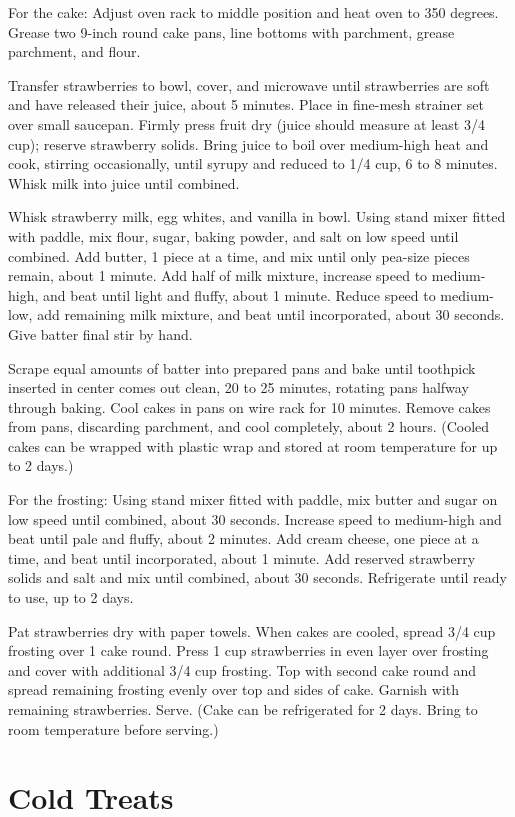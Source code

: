 \documentclass[12pt,landscape,twoside,twocolumn, openright, titlepage, draft]{book}
\begin{document}
For the cake: Adjust oven rack to middle position and heat oven to 350 degrees. Grease two 9-inch round cake pans, line bottoms with parchment, grease parchment, and flour.

Transfer strawberries to bowl, cover, and microwave until strawberries are soft and have released their juice, about 5 minutes. Place in fine-mesh strainer set over small saucepan. Firmly press fruit dry (juice should measure at least 3/4 cup); reserve strawberry solids. Bring juice to boil over medium-high heat and cook, stirring occasionally, until syrupy and reduced to 1/4 cup, 6 to 8 minutes. Whisk milk into juice until combined.

Whisk strawberry milk, egg whites, and vanilla in bowl. Using stand
mixer fitted with paddle, mix flour, sugar, baking powder, and salt on
low speed until combined. Add butter, 1 piece at a time, and mix until
only pea-size pieces remain, about 1 minute. Add half of milk mixture,
increase speed to medium-high, and beat until light and fluffy, about
1 minute. Reduce speed to medium-low, add remaining milk mixture, and
beat until incorporated, about 30 seconds. Give batter final stir by
hand.

Scrape equal amounts of batter into prepared pans and bake until
toothpick inserted in center comes out clean, 20 to 25 minutes,
rotating pans halfway through baking. Cool cakes in pans on wire rack
for 10 minutes. Remove cakes from pans, discarding parchment, and cool
completely, about 2 hours. (Cooled cakes can be wrapped with plastic
wrap and stored at room temperature for up to 2 days.)

For the frosting: Using stand mixer fitted with paddle, mix butter and
sugar on low speed until combined, about 30 seconds. Increase speed to
medium-high and beat until pale and fluffy, about 2 minutes. Add cream
cheese, one piece at a time, and beat until incorporated, about 1
minute. Add reserved strawberry solids and salt and mix until
combined, about 30 seconds. Refrigerate until ready to use, up to 2
days.

Pat strawberries dry with paper towels. When cakes are cooled, spread
3/4 cup frosting over 1 cake round. Press 1 cup strawberries in even
layer over frosting and cover with additional 3/4 cup frosting. Top
with second cake round and spread remaining frosting evenly over top
and sides of cake. Garnish with remaining strawberries. Serve. (Cake
can be refrigerated for 2 days. Bring to room temperature before
serving.)

\chapter{Cold Treats}
\end{document}
